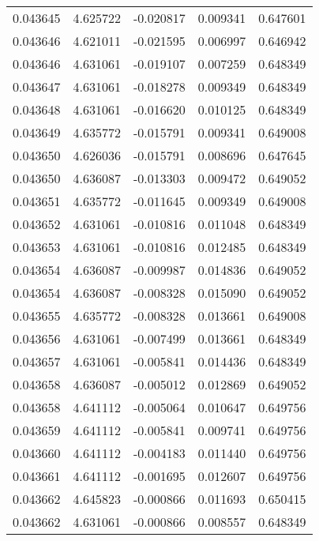 \begin{tabular}{lrrrr}
0.043645    &  4.625722 & -0.020817 &  0.009341 &             0.647601 \\
0.043646    &  4.621011 & -0.021595 &  0.006997 &             0.646942 \\
0.043646    &  4.631061 & -0.019107 &  0.007259 &             0.648349 \\
0.043647    &  4.631061 & -0.018278 &  0.009349 &             0.648349 \\
0.043648    &  4.631061 & -0.016620 &  0.010125 &             0.648349 \\
0.043649    &  4.635772 & -0.015791 &  0.009341 &             0.649008 \\
0.043650    &  4.626036 & -0.015791 &  0.008696 &             0.647645 \\
0.043650    &  4.636087 & -0.013303 &  0.009472 &             0.649052 \\
0.043651    &  4.635772 & -0.011645 &  0.009349 &             0.649008 \\
0.043652    &  4.631061 & -0.010816 &  0.011048 &             0.648349 \\
0.043653    &  4.631061 & -0.010816 &  0.012485 &             0.648349 \\
0.043654    &  4.636087 & -0.009987 &  0.014836 &             0.649052 \\
0.043654    &  4.636087 & -0.008328 &  0.015090 &             0.649052 \\
0.043655    &  4.635772 & -0.008328 &  0.013661 &             0.649008 \\
0.043656    &  4.631061 & -0.007499 &  0.013661 &             0.648349 \\
0.043657    &  4.631061 & -0.005841 &  0.014436 &             0.648349 \\
0.043658    &  4.636087 & -0.005012 &  0.012869 &             0.649052 \\
0.043658    &  4.641112 & -0.005064 &  0.010647 &             0.649756 \\
0.043659    &  4.641112 & -0.005841 &  0.009741 &             0.649756 \\
0.043660    &  4.641112 & -0.004183 &  0.011440 &             0.649756 \\
0.043661    &  4.641112 & -0.001695 &  0.012607 &             0.649756 \\
0.043662    &  4.645823 & -0.000866 &  0.011693 &             0.650415 \\
0.043662    &  4.631061 & -0.000866 &  0.008557 &             0.648349 \\

\end{tabular}
